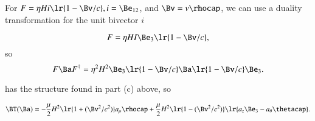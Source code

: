 For \( F = \eta H i \lr{ 1 - \Bv/c }, i = \Be_{12} \), and \( \Bv = v \rhocap \), we can use a duality transformation for the unit bivector \( i \)

\begin{dmath}\label{eqn:poyntingStaticExamples:1340}
F = \eta H I \Be_3 \lr{ 1 - \Bv/c },
\end{dmath}
so
\begin{dmath}\label{eqn:poyntingStaticExamples:1360}
F \Ba F^\dagger = \eta^2 H^2 \Be_3 \lr{ 1 - \Bv/c } \Ba \lr{ 1 - \Bv/c } \Be_3.
\end{dmath}

 has the structure found in part (c) above, so

\begin{dmath}\label{eqn:poyntingStaticExamples:1380}
\BT(\Ba)
=
-\frac{\mu}{2} H^2 \lr{ 1 + (\Bv^2/c^2) } a_\rho \rhocap
+
\frac{\mu}{2} H^2 \lr{ 1 - (\Bv^2/c^2) } \lr{ a_z \Be_3 - a_\theta \thetacap }.
\end{dmath}


